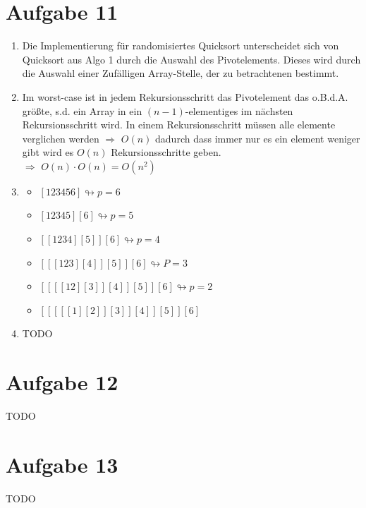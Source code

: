 \documentclass[10pt,a4paper]{article}
\begin{document}
\section*{Aufgabe 11}
    \begin{enumerate}[label={\alph*)}]
        \item
         Die Implementierung für randomisiertes Quicksort
         unterscheidet sich von Quicksort aus Algo 1 durch die
         Auswahl des Pivotelements. Dieses wird durch die Auswahl
         einer Zufälligen Array-Stelle, der zu betrachtenen bestimmt.
         \item
          Im worst-case ist in jedem Rekursionsschritt das Pivotelement
          das o.B.d.A. größte, s.d. ein Array in ein $(n-1)$-elementiges
          im nächsten Rekursionsschritt wird. In einem Rekursionsschritt
          müssen alle elemente verglichen werden $\Rightarrow$ $O(n)$ dadurch dass immer
          nur es ein element weniger gibt wird es $O(n)$ Rekursionsschritte
          geben.
          \\$\Rightarrow$ $O(n)\cdot O(n) = O(n^2)$
        \item
        \begin{itemize}
            \item $[123456] \looparrowright p=6$
            \item $[12345] [6] \looparrowright p=5$
            \item $[[1234] [5]] [6] \looparrowright p=4$
            \item $[[[123] [4]] [5]] [6] \looparrowright P=3$
            \item $[[[[12] [3]] [4]] [5]] [6] \looparrowright p=2$
            \item $[[[[[1] [2]] [3]] [4]] [5]] [6]$
        \end{itemize}
        \item TODO

    \end{enumerate}


\section*{Aufgabe 12}
    TODO

\section*{Aufgabe 13}
    TODO
\end{document}
